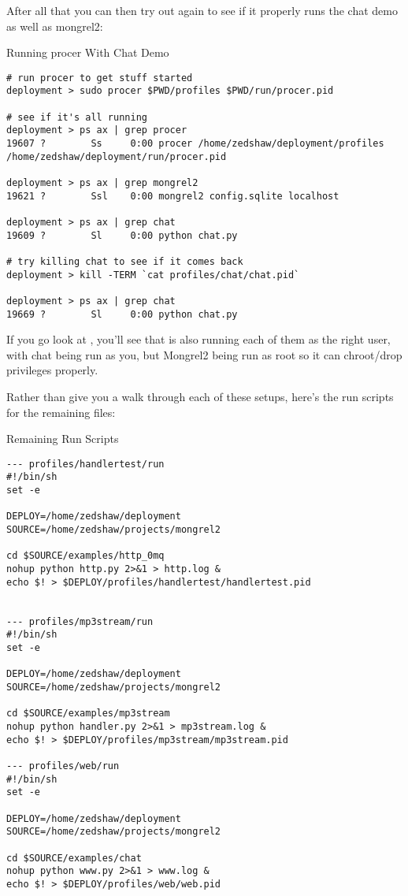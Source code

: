 After all that you can then try out  again to see if it
properly runs the chat demo as well as mongrel2:

\begin{code}{Running procer With Chat Demo}
\begin{Verbatim}
# run procer to get stuff started
deployment > sudo procer $PWD/profiles $PWD/run/procer.pid

# see if it's all running
deployment > ps ax | grep procer
19607 ?        Ss     0:00 procer /home/zedshaw/deployment/profiles /home/zedshaw/deployment/run/procer.pid

deployment > ps ax | grep mongrel2
19621 ?        Ssl    0:00 mongrel2 config.sqlite localhost

deployment > ps ax | grep chat
19609 ?        Sl     0:00 python chat.py

# try killing chat to see if it comes back
deployment > kill -TERM `cat profiles/chat/chat.pid`

deployment > ps ax | grep chat
19669 ?        Sl     0:00 python chat.py
\end{Verbatim}
\end{code}

If you go look at , you'll see that 
is also running each of them as the right user, with chat being run
as you, but Mongrel2 being run as root so it can chroot/drop privileges properly.

Rather than give you a walk through each of these setups, here's the
run scripts for the remaining files:

\begin{code}{Remaining Run Scripts}
\begin{Verbatim}
--- profiles/handlertest/run
#!/bin/sh
set -e

DEPLOY=/home/zedshaw/deployment
SOURCE=/home/zedshaw/projects/mongrel2

cd $SOURCE/examples/http_0mq
nohup python http.py 2>&1 > http.log &
echo $! > $DEPLOY/profiles/handlertest/handlertest.pid


--- profiles/mp3stream/run
#!/bin/sh
set -e

DEPLOY=/home/zedshaw/deployment
SOURCE=/home/zedshaw/projects/mongrel2

cd $SOURCE/examples/mp3stream
nohup python handler.py 2>&1 > mp3stream.log &
echo $! > $DEPLOY/profiles/mp3stream/mp3stream.pid

--- profiles/web/run
#!/bin/sh
set -e

DEPLOY=/home/zedshaw/deployment
SOURCE=/home/zedshaw/projects/mongrel2

cd $SOURCE/examples/chat
nohup python www.py 2>&1 > www.log &
echo $! > $DEPLOY/profiles/web/web.pid

\end{Verbatim}
\end{code}


